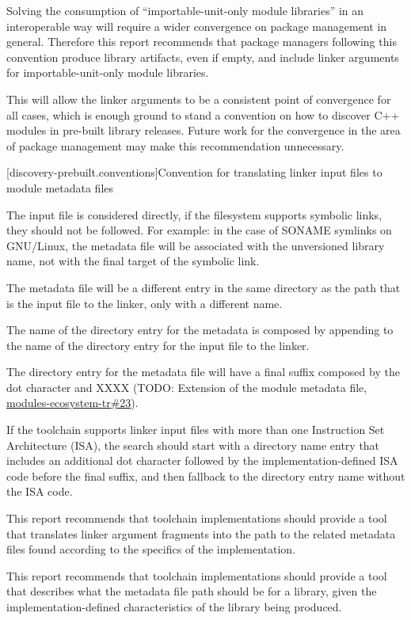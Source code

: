 \pnum Solving the consumption of “importable-unit-only module
libraries” in an interoperable way will require a wider convergence on
package management in general. Therefore this report recommends that
package managers following this convention produce library artifacts,
even if empty, and include linker arguments for importable-unit-only
module libraries.

\pnum This will allow the linker arguments to be a consistent point of
convergence for all cases, which is enough ground to stand a
convention on how to discover C++ modules in pre-built library
releases. Future work for the convergence in the area of package
management may make this recommendation unnecessary.

[discovery-prebuilt.conventions]{Convention for translating
  linker input files to module metadata files}

\pnum The input file is considered directly, if the filesystem
supports symbolic links, they should not be followed. For example: in
the case of SONAME symlinks on GNU/Linux, the metadata file will be
associated with the unversioned library name, not with the final
target of the symbolic link.

\pnum The metadata file will be a different entry in the same
directory as the path that is the input file to the linker, only with
a different name.

\pnum The name of the directory entry for the metadata is composed by
appending to the name of the directory entry for the input file to the
linker.

\pnum The directory entry for the metadata file will have a final suffix
composed by the dot character and XXXX (TODO: Extension of the module
metadata file,
\href{https://github.com/cplusplus/modules-ecosystem-tr/issues/23}{modules-ecosystem-tr\#23}).

\pnum If the toolchain supports linker input files with more than one
Instruction Set Architecture (ISA), the search should start with a
directory name entry that includes an additional dot character
followed by the implementation-defined ISA code before the final
suffix, and then fallback to the directory entry name without the ISA
code.

\pnum This report recommends that toolchain implementations should
provide a tool that translates linker argument fragments into the path
to the related metadata files found according to the specifics of the
implementation.

\pnum This report recommends that toolchain implementations should
provide a tool that describes what the metadata file path should be
for a library, given the implementation-defined characteristics of the
library being produced.
